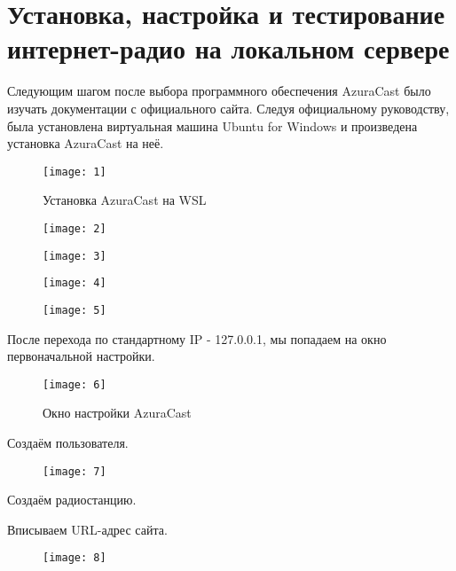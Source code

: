 \section{Установка, настройка и тестирование интернет-радио на локальном сервере}

Следующим шагом после выбора программного обеспечения AzuraCast было изучать документации с официального сайта. Следуя официальному руководству, была установлена виртуальная машина Ubuntu for Windows и произведена установка AzuraCast на неё.

\begin{figure}[H]
  \centering
  \texttt{[image: 1]}
  \caption{Установка AzuraCast на WSL}
  \label{fig:1}
\end{figure}

\begin{figure}[H]
  \centering
  \texttt{[image: 2]}
  \caption{}
  \label{fig:2}
\end{figure}

\begin{figure}[H]
  \centering
  \texttt{[image: 3]}
  \caption{}
  \label{fig:3}
\end{figure}

\begin{figure}[H]
  \centering
  \texttt{[image: 4]}
  \caption{}
  \label{fig:4}
\end{figure}

\begin{figure}[H]
  \centering
  \texttt{[image: 5]}
  \caption{}
  \label{fig:5}
\end{figure}

После перехода по стандартному IP - 127.0.0.1, мы попадаем на окно первоначальной настройки.
\begin{figure}[H]
  \centering
  \texttt{[image: 6]}
  \caption{Окно настройки AzuraCast}
  \label{fig:6}
\end{figure}

Создаём пользователя.
\begin{figure}[H]
  \centering
  \texttt{[image: 7]}
  \caption{}
  \label{fig:7}
\end{figure}

Создаём радиостанцию.

Вписываем URL-адрес сайта.
\begin{figure}[H]
  \centering
  \texttt{[image: 8]}
  \caption{}
  \label{fig:8}
\end{figure}

